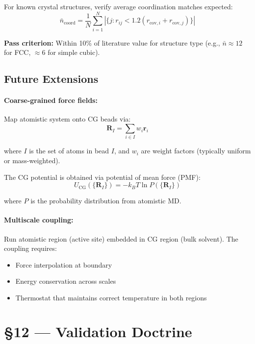 \documentclass[11pt]{article}
\begin{document}
For known crystal structures, verify average coordination matches expected:
\begin{equation}
\bar{n}_{\text{coord}} = \frac{1}{N}\sum_{i=1}^{N} |\{j : r_{ij} < 1.2(r_{\text{cov},i} + r_{\text{cov},j})\}|
\end{equation}

\textbf{Pass criterion:} Within 10\% of literature value for structure type (e.g., $\bar{n} \approx 12$ for FCC, $\approx 6$ for simple cubic).

\subsection{Future Extensions}

\paragraph{Coarse-grained force fields:}

Map atomistic system onto CG beads via:
\begin{equation}
\mathbf{R}_I = \sum_{i \in I} w_i \mathbf{r}_i
\end{equation}

where $I$ is the set of atoms in bead $I$, and $w_i$ are weight factors (typically uniform or mass-weighted).

The CG potential is obtained via potential of mean force (PMF):
\begin{equation}
U_{\text{CG}}(\{\mathbf{R}_I\}) = -k_B T \ln P(\{\mathbf{R}_I\})
\end{equation}

where $P$ is the probability distribution from atomistic MD.

\paragraph{Multiscale coupling:}

Run atomistic region (active site) embedded in CG region (bulk solvent). The coupling requires:
\begin{itemize}
\item Force interpolation at boundary
\item Energy conservation across scales
\item Thermostat that maintains correct temperature in both regions
\end{itemize}

\section{§12 — Validation Doctrine}
\end{document}
